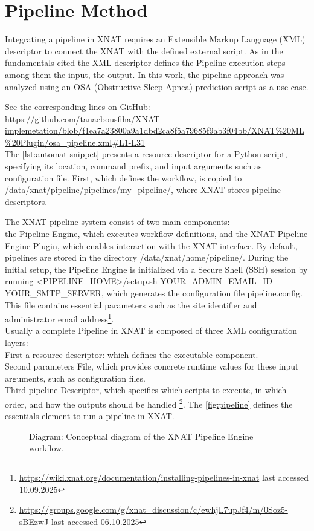 
\section{Pipeline Method}

Integrating a pipeline in XNAT requires an Extensible Markup Language (XML) descriptor to connect the XNAT with the defined external script. As in the fundamentals cited the XML descriptor defines the Pipeline execution steps among them the input, the output. In this work, the pipeline approach was analyzed using an OSA (Obstructive Sleep Apnea) prediction script as a use case.
\normalsize



\noindent\footnotesize See the corresponding lines on GitHub:\url{ https://github.com/tanaebousfiha/XNAT-implemetation/blob/f1ea7a23800a9a1dbd2ca8f5a79685f9ab3f04bb/XNAT%20ML%20Plugin/osa_pipeline.xml#L1-L31}
\normalsize
\\
The \autoref{lst:automat-snippet} presents a resource descriptor for a Python script, specifying its location, command prefix, and input arguments such as configuration file. First, which defines the workflow, is copied to /data/xnat/pipeline/pipelines/my\_pipeline/, where XNAT stores pipeline descriptors. 

The XNAT pipeline system consist of two main components: \\
the Pipeline Engine, which executes workflow definitions, and the XNAT Pipeline Engine Plugin, which enables interaction with the XNAT interface.
By default, pipelines are stored in the directory /data/xnat/home/pipeline/. During the initial setup, the Pipeline Engine is initialized via a Secure Shell (SSH) session by running
<PIPELINE\_HOME>/setup.sh YOUR\_ADMIN\_EMAIL\_ID YOUR\_SMTP\_SERVER,
which generates the configuration file pipeline.config. This file contains essential parameters such as the site identifier and administrator email address\footnote{\url{https://wiki.xnat.org/documentation/installing-pipelines-in-xnat} last accessed 10.09.2025}.\\
Usually a complete Pipeline in XNAT is composed of three XML configuration layers:\\
First a resource descriptor: which defines the executable component. \\
Second parameters File, which provides concrete runtime values for these input arguments, such as configuration files.\\
Third pipeline Descriptor, which  specifies which scripts to execute, in which order, and how the outputs should be handled \footnote{\url{https://groups.google.com/g/xnat_discussion/c/ewhjL7upJf4/m/0Soz5-sBEzwJ} last accessed 06.10.2025}. The \autoref{fig:pipeline} defines the essentials element to run a pipeline in XNAT. 
\begin{figure}[H]
    \centering
    \def\svgwidth{0.7\linewidth}
    
    \caption{ Diagram: Conceptual diagram of the XNAT Pipeline Engine workflow.}
    \label{fig:pipeline}
\end{figure}

